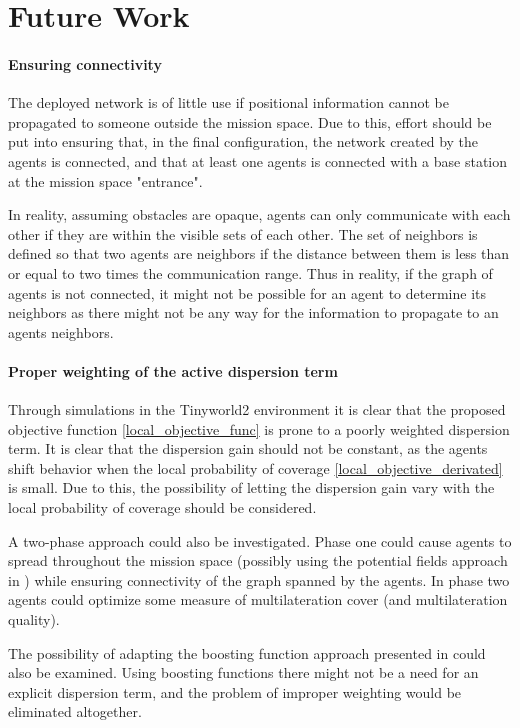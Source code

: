 \section{Future Work}
\paragraph{Ensuring connectivity}
The deployed network is of little use if positional information cannot be propagated to someone outside the mission space.
Due to this, effort should be put into ensuring that, in the final configuration, the network created by the agents 
is connected, and that at least one agents is connected with a base station at the mission space "entrance".

In reality, assuming obstacles are opaque, agents can only communicate with each other if they are within the visible sets of each other. 
The set of neighbors is defined so that two agents are neighbors if the distance between them is less than or equal to two times the communication range.
Thus in reality, if the graph of agents is not connected, it might not be possible for an agent to determine its neighbors as there might not be any way for 
the information to propagate to an agents neighbors.

\paragraph{Proper weighting of the active dispersion term}
Through simulations in the Tinyworld2 environment it is clear that the proposed objective function \eqref{local_objective_func} is 
prone to a poorly weighted dispersion term. It is clear that the dispersion gain should not be constant, 
as the agents shift behavior when the local probability of coverage \eqref{local_objective_derivated} is small. Due to this,
the possibility of letting the dispersion gain vary with the local probability of coverage should be considered. 

A two-phase 
approach could also be investigated. Phase one could cause agents to spread throughout the mission space (possibly using the potential fields
approach in \cite{pot_field}) while ensuring connectivity of the graph spanned by the agents. In phase two agents could optimize some
measure of multilateration cover (and multilateration quality).

The possibility of adapting the boosting function approach presented in \cite{sun2014escaping} could also be examined. Using boosting
functions there might not be a need for an explicit dispersion term, and the problem of improper weighting would be eliminated altogether.

